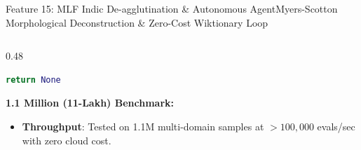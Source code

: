 \documentclass[aspectratio=169,10pt]{beamer}
\begin{document}
\begin{frame}[fragile,t]{Feature 15: MLF Indic De-agglutination \& Autonomous Agent}{Myers-Scotton Morphological Deconstruction \& Zero-Cost Wiktionary Loop}
\begin{columns}[t]
\begin{column}{0.48\textwidth}
\begin{lstlisting}[language=Python]
    return None
\end{lstlisting}
      \vspace{0.08cm}
      {\fontsize{8.0}{10.0}\selectfont\textbf{\textcolor{KoinexaOrange}{1.1 Million (11-Lakh) Benchmark:}}}
      \begin{itemize}\setlength{\itemsep}{0.8pt}
        \item {\fontsize{7.5}{9.2}\selectfont \textbf{Throughput}: Tested on 1.1M multi-domain samples at $> 100,000$ evals/sec with zero cloud cost.}
      \end{itemize}
    \end{column}
  \end{columns}
\end{frame}

\end{document}
